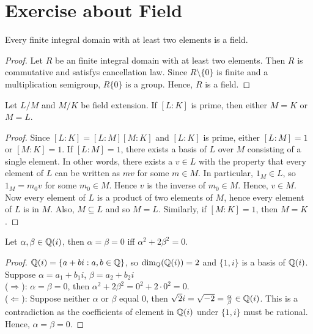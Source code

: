 \chapter{Exercise about Field}

\begin{exercise}{}{}
    Every finite integral domain with at least two elements is a field.
\end{exercise}

\begin{proof}
    Let $R$ be an finite integral domain with at least two elements. Then $R$ is commutative and satisfys cancellation law.
    Since $R\setminus\{0\}$ is finite and a multiplication semigroup, $R\{0\}$ is a group. Hence, $R$ is a field. 
\end{proof}

\begin{exercise}{}{}
    Let $L/M$ and $M/K$ be field extension. If $[L:K]$ is prime, then either $M=K$ or $M=L$.
\end{exercise}

\begin{proof}
    Since $[L:K]=[L:M][M:K]$ and $[L:K]$ is prime, either $[L:M]=1$ or $[M:K]=1$.
    If $[L:M]=1$, there exists a basis of $L$ over $M$ consisting of a single element. 
    In other words, there exists a $v\in L$ with the property that every element of $L$
    can be written as $mv$ for some $m\in M$. In particular, $1_M\in L$, so $1_M=m_0v$ 
    for some $m_0\in M$.
    Hence $v$ is the inverse of $m_0\in M$. Hence, $v\in M$. 
    Now every element of $L$ is a product of two elements of $M$, 
    hence every element of $L$ 
    is in $M$. Also, $M\subseteq L$ and so $M=L$. Similarly, if $[M:K]=1$, then $M=K$.
\end{proof}

\begin{exercise}{}{}
    Let $\alpha,\beta\in \mathbb{Q}(i)$, then $\alpha=\beta=0$ iff $\alpha^2+2\beta^2=0$.
\end{exercise}

\begin{proof}
    $\mathbb{Q}(i)=\{a+bi:a,b\in \mathbb{Q}\}$, so $\text{dim}_{\mathbb{Q}}(\mathbb{Q}(i))= 2$ and $\{1,i\}$ is a basis of $\mathbb{Q}(i)$. 
    Suppose $\alpha=a_1+b_1i$, $\beta=a_2+b_2i$\\
    ($\Rightarrow$): $\alpha=\beta=0$, then $\alpha^2+2\beta^2=0^2+2\cdot 0^2=0$.\\
    ($\Leftarrow$): Suppose neither $\alpha$ or $\beta$ equal $0$, then $\sqrt{2}i=\sqrt{-2}=\frac{\alpha}{\beta}\in \mathbb{Q}(i)$. 
    This is a contradiction as the coefficients of element in $\mathbb{Q}(i)$ under $\{1,i\}$ must be rational. 
    Hence, $\alpha=\beta=0$. 
\end{proof}

